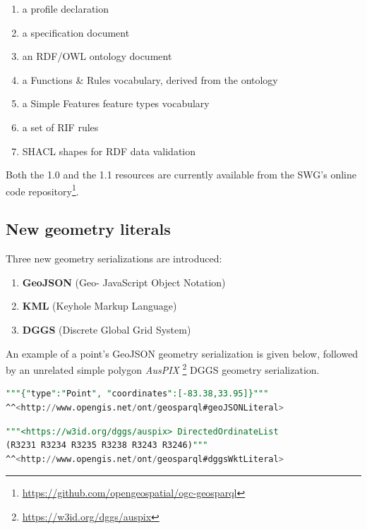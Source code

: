\documentclass[runningheads]{llncs}
\begin{document}
\begin{enumerate}
    \item a profile declaration
    \item a specification document
    \item an RDF/OWL ontology document
    \item a Functions \& Rules vocabulary, derived from the ontology
    \item a Simple Features feature types vocabulary
    \item a set of RIF\cite{kifer2013rif} rules
    \item SHACL\cite{knublauch_shapes_2017} shapes for RDF data validation 
\end{enumerate}

Both the 1.0 and the 1.1 resources are currently available from the SWG's online code repository\footnote{\url{https://github.com/opengeospatial/ogc-geosparql}}.

\subsection{New geometry literals}\label{sec:newliterals}
Three new geometry serializations are introduced: 

\begin{enumerate}
    \item \textbf{GeoJSON} (Geo- JavaScript Object Notation)\cite{butler2016geojson}
    \item \textbf{KML} (Keyhole Markup Language)\cite{nolan2014keyhole} 
    \item \textbf{DGGS} (Discrete Global Grid System)\cite{sahr1998discrete}
\end{enumerate} 

An example of a point's GeoJSON geometry serialization is given below, followed by an unrelated simple polygon \textit{AusPIX}
\footnote{\url{https://w3id.org/dggs/auspix}} DGGS geometry serialization.

\small
\begin{lstlisting}[caption=GeoJSON geometry serialization example,label=lst:geojsonliteral,language=sql,frame=single,basicstyle=\ttfamily,showstringspaces=false]
"""{"type":"Point", "coordinates":[-83.38,33.95]}"""
^^<http://www.opengis.net/ont/geosparql#geoJSONLiteral>
\end{lstlisting}

\begin{lstlisting}[caption=AusPIX DGGS geometry serialization example,label=lst:geodggsWktliteral,language=sql,frame=single,basicstyle=\ttfamily,showstringspaces=false]
"""<https://w3id.org/dggs/auspix> DirectedOrdinateList 
(R3231 R3234 R3235 R3238 R3243 R3246)"""
^^<http://www.opengis.net/ont/geosparql#dggsWktLiteral>
\end{lstlisting}
\normalsize
\end{document}
